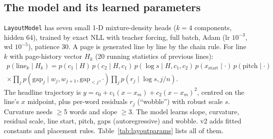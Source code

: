 \documentclass[10.5pt,a4paper]{article}
\begin{document}
\subsection{The model and its learned parameters}
\label{sec:layoutmodel}
\texttt{LayoutModel} has seven small 1-D mixture-density heads ($k=4$ components, hidden 64), trained by exact NLL with
teacher forcing, full batch, Adam (lr $10^{-3}$, wd $10^{-5}$), patience 30. A page is generated line by line by the chain
rule. For line $k$ with page-history vector $H_k$ (20 running statistics of previous lines):
\begin{multline}
p(\text{line}_k\mid H_k)=p(c_1\mid H)\,p(c_2\mid H,c_1)\,p(\log s\mid H,c_1,c_2)\,p(x_\mathrm{start}\mid\cdot)\,
p(\mathrm{pitch}\mid\cdot)\\ \times\prod_{j}p(\mathrm{gap}_j\mid w_j,w_{j+1},\mathrm{gap}_{<j},\cdot)\prod_j p(r_j\mid \log s,j/n).
\end{multline}
The headline trajectory is $y=c_0+c_1(x-x_m)+c_2(x-x_m)^2$, centred on the line's $x$ midpoint, plus per-word residuals
$r_j$ (``wobble'') with robust scale $s$. Curvature needs $\ge$5 words and slope $\ge$3. The model learns slope, curvature,
residual scale, line start, pitch, gaps (autoregressive) and wobble. v2 adds fitted constants and placement rules.
Table~\ref{tab:layoutparams} lists all of them.
\end{document}
